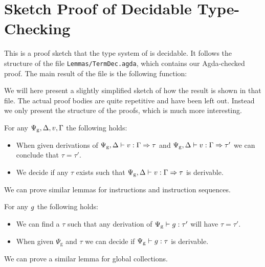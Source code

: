 \chapter{Sketch Proof of Decidable Type-Checking}
\label{sec:decproof}

This is a proof sketch that the type system of \ATAL is decidable. It follows
the structure of the file \texttt{Lemmas/TermDec.agda}, which contains our
Agda-checked proof. The main result of the file is the following function:

\begin{code}
\> \AgdaSymbol{:}     \AgdaSymbol{(}  \AgdaSymbol{)}\<%
\end{code}

We will here present a slightly simplified sketch of how the result is shown in
that file. The actual proof bodies are quite repetitive and have been left
out. Instead we only present the structure of the proofs, which is much more
interesting.

\begin{lemma}
  \label{lemma:dec-v}
  For any $\Psi_{\mathrm{g}},\Delta, v,\Gamma$ the following holds:

  \begin{itemize}
  \item When given derivations of
    ${\Psi_{\mathrm{g}},\Delta} |- {v} : {\Gamma => \tau}$ and
    ${\Psi_{\mathrm{g}},\Delta} |- {v} : {\Gamma => \tau'}$ we can
    conclude that $\tau = \tau'$.
  \item We decide if any $\tau$ exists such that
    ${\Psi_{\mathrm{g}},\Delta} |- {v} : {\Gamma => \tau}$ is derivable.
  \end{itemize}

  We can prove similar lemmas for instructions and instruction sequences.
\end{lemma}


\begin{lemma}
  \label{lemma:dec-g}
  For any $g$ the following holds:

  \begin{itemize}
  \item We can find a $\tau$ such that any derivation of
    ${\Psi_{\mathrm{g}}} |- {g} : {\tau'}$ will have $\tau = \tau'$.
  \item When given $\Psi_{\mathrm{g}}$ and $\tau$ we can decide if
    ${\Psi_{\mathrm{g}}} |- {g} : {\tau}$ is derivable.
  \end{itemize}

  We can prove a similar lemma for global collections.
\end{lemma}

